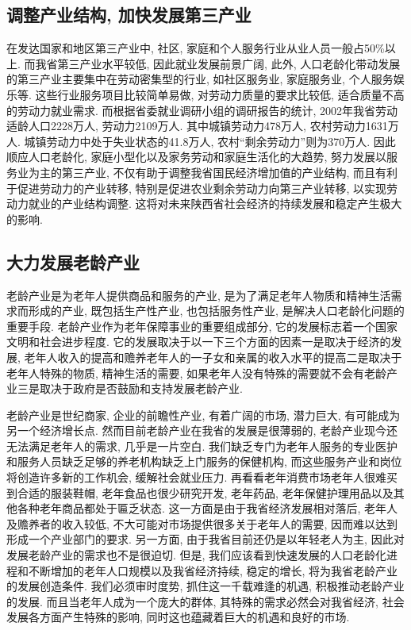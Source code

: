 \documentclass[a4paper, 12pt, UTF8]{article}
\begin{document}
\subsection{调整产业结构,  加快发展第三产业}
在发达国家和地区第三产业中, 社区, 家庭和个人服务行业从业人员一般占50\%以上. 而我省第三产业水平较低, 因此就业发展前景广阔, 此外, 人口老龄化带动发展的第三产业主要集中在劳动密集型的行业, 如社区服务业, 家庭服务业, 个人服务娱乐等. 这些行业服务项目比较简单易做, 对劳动力质量的要求比较低, 适合质量不高的劳动力就业需求. 而根据省委就业调研小组的调研报告的统计, 2002年我省劳动适龄人口2228万人, 劳动力2109万人. 其中城镇劳动力478万人, 农村劳动力1631万人. 城镇劳动力中处于失业状态的41.8万人, 农村``剩余劳动力''则为370万人. 因此顺应人口老龄化, 家庭小型化以及家务劳动和家庭生活化的大趋势, 努力发展以服务业为主的第三产业, 不仅有助于调整我省国民经济增加值的产业结构, 而且有利于促进劳动力的产业转移, 特别是促进农业剩余劳动力向第三产业转移, 以实现劳动力就业的产业结构调整. 这将对未来陕西省社会经济的持续发展和稳定产生极大的影响. 

\subsection{大力发展老龄产业}
老龄产业是为老年人提供商品和服务的产业, 是为了满足老年人物质和精神生活需求而形成的产业, 既包括生产性产业, 也包括服务性产业, 是解决人口老龄化问题的重要手段. 老龄产业作为老年保障事业的重要组成部分, 它的发展标志着一个国家文明和社会进步程度. 它的发展取决于以一下三个方面的因素一是取决于经济的发展, 老年人收入的提高和赡养老年人的一子女和亲属的收入水平的提高二是取决于老年人特殊的物质, 精神生活的需要, 如果老年人没有特殊的需要就不会有老龄产业三是取决于政府是否鼓励和支持发展老龄产业. 

老龄产业是世纪商家, 企业的前瞻性产业, 有着广阔的市场, 潜力巨大, 有可能成为另一个经济增长点. 然而目前老龄产业在我省的发展是很薄弱的, 老龄产业现今还无法满足老年人的需求, 几乎是一片空白. 我们缺乏专门为老年人服务的专业医护和服务人员缺乏足够的养老机构缺乏上门服务的保健机构, 而这些服务产业和岗位将创造许多新的工作机会, 缓解社会就业压力. 再看看老年消费市场老年人很难买到合适的服装鞋帽, 老年食品也很少研究开发, 老年药品, 老年保健护理用品以及其他各种老年商品都处于匾乏状态. 这一方面是由于我省经济发展相对落后, 老年人及赡养者的收入较低, 不大可能对市场提供很多关于老年人的需要, 因而难以达到形成一个产业部门的要求. 另一方面, 由于我省目前还仍是以年轻老人为主, 因此对发展老龄产业的需求也不是很迫切. 但是, 我们应该看到快速发展的人口老龄化进程和不断增加的老年人口规模以及我省经济持续, 稳定的增长, 将为我省老龄产业的发展创造条件. 我们必须审时度势, 抓住这一千载难逢的机遇, 积极推动老龄产业的发展. 而且当老年人成为一个庞大的群体, 其特殊的需求必然会对我省经济, 社会发展各方面产生特殊的影响, 同时这也蕴藏着巨大的机遇和良好的市场. 
\end{document}
